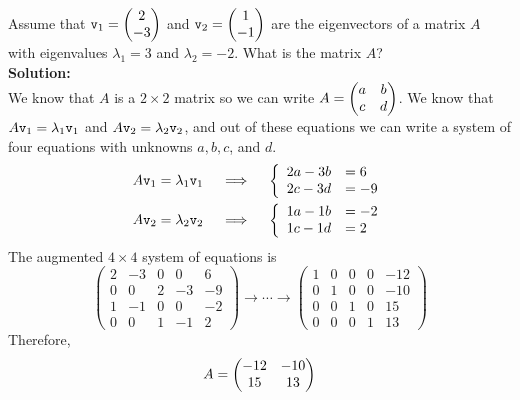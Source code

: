 \begin{example}
Assume that $\texttt{v}_1 =\begin{pmatrix} 2 \\ -3 \end{pmatrix}$ and $\texttt{v}_2 = \begin{pmatrix} 1 \\ -1 \end{pmatrix}$ are the
eigenvectors of a matrix $A$ with eigenvalues $\lambda_1 = 3$ and $\lambda_2 = -2$.  What
is the matrix $A$?
\\{\bf Solution:}\\
We know that $A$ is a $2 \times 2$ matrix so we can write $A = \begin{pmatrix} a & b \\ c & d \end{pmatrix}$.
We know that $A \texttt{v}_1 = \lambda_1 \texttt{v}_1$ and $A \texttt{v}_2 = \lambda_2 \texttt{v}_2$, and out of these
equations we can write a system of four equations with unknowns $a,b,c$, and $d$.
\begin{align*}
    A\texttt{v}_1 = \lambda_1 \texttt{v}_1 &\quad \implies \quad \left\{\begin{array}{rl} 2a-3b &= 6 \\ 2c-3d
        &= -9 \end{array} \right. \\
    A\texttt{v}_2 = \lambda_2 \texttt{v}_2 &\quad \implies \quad \left\{ \begin{array}{rl} 1a-1b &= -2 \\ 1c-1d
        &= 2 \end{array} \right.
\end{align*}
The augmented $4 \times 4$ system of equations is
\[ \left( \begin{array}{cccc|c} 2 & -3 & 0 & 0 & 6 \\
                                0 & 0 & 2 & -3 & -9 \\
                                1 & -1 & 0 & 0 & -2 \\
                                0 & 0 & 1 & -1 & 2 \end{array} \right) 
    \to \cdots \to
    \left( \begin{array}{cccc|c} 1 & 0 & 0 & 0 & -12 \\
                                 0 & 1 & 0 & 0 & -10 \\
                                 0 & 0 & 1 & 0 & 15 \\
                                 0 & 0 & 0 & 1 & 13 \end{array} \right)
        \]
Therefore, 
\[A = \begin{pmatrix} -12 & -10 \\ 15 & 13 \end{pmatrix} \]
\end{example}

